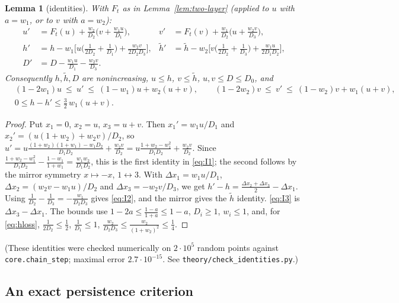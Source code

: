 \documentclass[11pt]{article}
\newtheorem{lemma}[theorem]{Lemma}
\theoremstyle{definition}
\theoremstyle{remark}
\begin{document}
\begin{lemma}[identities]\label{lem:id}
With $F_t$ as in Lemma~\ref{lem:two-layer} (applied to $u$ with $a=w_1$, or to $v$ with $a=w_2$):
\begin{align}
u'&=F_t(u)+\frac{w_2}{D_2}\Big(v+\frac{w_1u}{D_1}\Big), &
v'&=F_t(v)+\frac{w_1}{D_2}\Big(u+\frac{w_2v}{D_3}\Big),\label{eq:I1}\\
h'&=h-w_1\Big[u\Big(\frac1{2D_2}+\frac1{D_1}\Big)+\frac{w_2v}{2D_2D_3}\Big], &
\tilde h'&=\tilde h-w_2\Big[v\Big(\frac1{2D_2}+\frac1{D_3}\Big)+\frac{w_1u}{2D_1D_2}\Big],\label{eq:I2}\\
D'&=D-\frac{w_1u}{D_1}-\frac{w_2v}{D_3}. \label{eq:I3}
\end{align}
Consequently $h,\tilde h,D$ are nonincreasing, $u\le h$, $v\le\tilde h$, $u,v\le D\le D_0$, and
\begin{align}
&(1-2w_1)u\ \le\ u'\ \le\ (1-w_1)u+w_2(u+v),\qquad (1-2w_2)v\ \le\ v'\ \le\ (1-w_2)v+w_1(u+v),\label{eq:bounds}\\
&0\le h-h'\le\tfrac32\,w_1(u+v). \label{eq:hloss}
\end{align}
\end{lemma}
\begin{proof}
Put $x_1=0$, $x_2=u$, $x_3=u+v$. Then $x_1'=w_1u/D_1$ and $x_2'=(u(1+w_2)+w_2v)/D_2$, so
$u'=u\frac{(1+w_2)(1+w_1)-w_1D_2}{D_1D_2}+\frac{w_2v}{D_2}=u\frac{1+w_2-w_1^2}{D_1D_2}+\frac{w_2v}{D_2}$. Since
$\frac{1+w_2-w_1^2}{D_1D_2}-\frac{1-w_1}{1+w_1}=\frac{w_1w_2}{D_1D_2}$, this is the first identity in \eqref{eq:I1}; the
second follows by the mirror symmetry $x\mapsto-x$, $1\leftrightarrow3$. With $\Delta x_1=w_1u/D_1$,
$\Delta x_2=(w_2v-w_1u)/D_2$ and $\Delta x_3=-w_2v/D_3$, we get
$h'-h=\frac{\Delta x_2+\Delta x_3}2-\Delta x_1$. Using $\frac1{D_2}-\frac1{D_3}=-\frac{w_1}{D_2D_3}$ gives
\eqref{eq:I2}, and the mirror gives the $\tilde h$ identity. \eqref{eq:I3} is $\Delta x_3-\Delta x_1$.
The bounds use $1-2a\le\frac{1-a}{1+a}\le1-a$, $D_i\ge1$, $w_i\le1$, and, for \eqref{eq:hloss},
$\frac1{2D_2}\le\frac12$, $\frac1{D_1}\le1$, $\frac{w_2}{D_2D_3}\le\frac{w_2}{(1+w_2)^2}\le\frac14$.
\end{proof}
(These identities were checked numerically on $2\cdot10^5$ random points against \texttt{core.chain\_step};
maximal error $2.7\cdot10^{-15}$. See \texttt{theory/check\_identities.py}.)

\subsection{An exact persistence criterion}
\end{document}
